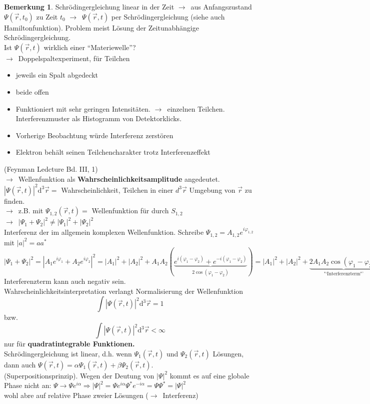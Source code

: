 \documentclass[oneside]{book}
\theoremstyle{definition}
\newtheorem*{bemerkung*}{Bemerkung}
\newcommand{\conseq}{$\rightarrow$~}
\newcommand{\circled}[1]{\tikz[baseline=(char.base)]{
		\node[shape=circle,draw,inner sep=2pt] (char) {#1};}}
\renewcommand{\d}{\mathrm d}
\newcommand{\vp}{\varphi}
\newcommand{\celectron}{\circled{$e^-$}}
\begin{document}
\begin{bemerkung*}
	Schrödingergleichung linear in der Zeit \conseq aus Anfangszustand $\Psi(\vec{r}, t_0)$ zu Zeit $t_0$ \conseq $\Psi(\vec{r}, t)$ per Schrödingergleichung (siehe auch Hamiltonfunktion). Problem meist Lösung der Zeitunabhängige Schrödingergleichung.\\
	Ist $\Psi(\vec{r}, t)$ wirklich einer "`Materiewelle"'?\\
	\conseq Doppelspaltexperiment, für Teilchen \celectron
	\begin{itemize}
		\item jeweils ein Spalt abgedeckt
		\item beide offen
	\end{itemize}
	\begin{itemize}
		\item Funktioniert mit sehr geringen Intensitäten. \conseq einzelnen Teilchen. Interferenzmuster als Histogramm von Detektorklicks.
		\item Vorherige Beobachtung würde Interferenz zerstören
		\item Elektron behält seinen Teilchencharakter trotz Interferenzeffekt
	\end{itemize}
	(Feynman Ledcture Bd. III, 1)\\
	\conseq Wellenfunktion als \textbf{Wahrscheinlichkeitsamplitude} angedeutet.\\
	$|\Psi(\vec{r}, t)|^2 \d^3 \vec{r} = $ Wahrscheinlichkeit, Teilchen in einer $d^3 \vec{r}$ Umgebung von $\vec{r}$ zu finden.\\
	\conseq z.B. mit $\Psi_{1,2}(\vec{r}, t) = $ Wellenfunktion für \celectron durch $S_{1, 2}$\\
	\conseq $|\Psi_1 + \Psi_2|^2 \neq |\Psi_1|^2 + |\Psi_2|^2$\\
	Interferenz der im allgemein komplexen Wellenfunktion. Schreibe $\Psi_{1,2}= A_{1,2} e^{i\vp_{1,2}}$ mit $|a|^2 = a a^\ast$\\
	$|\Psi_1 + \Psi_2|^2 = |A_1 e^{i\vp_1} + A_2 e^{i \vp_2}|^2 = |A_1|^2 + |A_2|^2 + A_1 A_2 (\underbrace{e^{i(\vp_1 - \vp_2)} + e^{-i(\vp_1 - \vp_2)}}_{2\cos(\vp_1 - \vp_2)}) = |A_1|^2 + |A_2|^2 + \underbrace{2 A_1 A_2 \cos(\vp_1 - \vp_2)}_{\text{"`Interferenzterm"'}}$\\
	Interferenzterm kann auch negativ sein.\\
	Wahrscheinlichkeitsinterpretation verlangt Normalisierung der Wellenfunktion
	$$\int |\Psi(\vec{r}, t)|^2 \d^3 \vec{r} = 1$$
	bzw.
	$$\int |\Psi(\vec{r}, t)|^2 \d^3 \vec{r} < \infty$$
	nur für \textbf{quadratintegrable Funktionen.}\\
	Schrödingergleichung ist linear, d.h. wenn $\Psi_1(\vec{r}, t)$ und $\Psi_2(\vec{r}, t)$ Lösungen, dann auch $\Psi(\vec{r}, t) = \alpha \Psi_1(\vec{r}, t) + \beta \Psi_2(\vec{r}, t)$.\\
	(Superpositionsprinzip). Wegen der Deutung von $|\Psi|^2$ kommt es auf eine globale Phase nicht an: $\Psi \to \Psi e^{i\alpha} \Rightarrow |\Psi|^2 = \Psi e^{i\alpha} \Psi^\ast e^{-i\alpha} = \Psi \Psi^\ast = |\Psi|^2$\\
	wohl abre auf relative Phase zweier Lösungen (\conseq Interferenz)

\end{bemerkung*}
\end{document}

